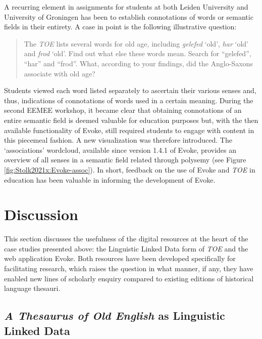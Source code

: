 A recurring element in assignments for students at both Leiden University and University of Groningen has been to establish connotations of words or semantic fields in their entirety. A case in point is the following illustrative question: 
\begin{quote}
    The \textit{TOE} lists several words for old age, including \textit{gelefed} `old', \textit{har} `old' and \textit{frod} `old'. Find out what else these words mean. Search for ``gelefed'', ``har'' and ``frod''. What, according to your findings, did the Anglo-Saxons associate with old age?
\end{quote}
\noindent Students viewed each word listed separately to ascertain their various senses and, thus, indications of connotations of words used in a certain meaning. During the second EEMEE workshop, it became clear that obtaining connotations of an entire semantic field is deemed valuable for education purposes but, with the then available functionality of Evoke, still required students to engage with content in this piecemeal fashion. A new visualization was therefore introduced. The `associations' wordcloud, available since version 1.4.1 of Evoke, provides an overview of all senses in a semantic field related through polysemy (see Figure \ref{fig:Stolk2021x:Evoke-assoc}). In short, feedback on the use of Evoke and \textit{TOE} in education has been valuable in informing the development of Evoke.


\section{Discussion}
\label{sect:Stolk2021x:discussion}

This section discusses the usefulness of the digital resources at the heart of the case studies presented above: 
the Linguistic Linked Data form of \textit{TOE} and the web application Evoke. Both resources have been developed specifically for facilitating research, which raises the question in what manner, if any, they have enabled new lines of scholarly enquiry compared to existing editions of historical language thesauri. %

\subsection{\textit{A Thesaurus of Old English} as Linguistic Linked Data}

